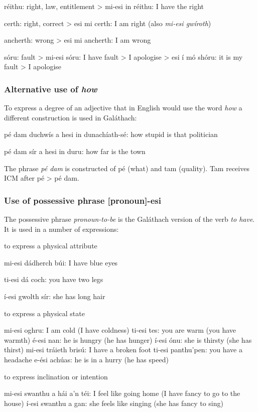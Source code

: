 r\'{e}ithu: right, law, entitlement
> mi-esi in r\'{e}ithu: I have the right

certh: right, correct
> esi mi certh: I am right (also \textit{mi-esi gw\'{i}roth})

ancherth: wrong
> esi mi ancherth: I am wrong

s\'{o}ru: fault
> mi-esi s\'{o}ru: I have fault > I apologise
> esi \'{i} m\'{o} sh\'{o}ru: it is my fault > I apologise

\subsubsection{Alternative use of \textit{how}}

To express a degree of an adjective that in English would use the word \textit{how} a different construction is used in Gal\'{a}thach:

p\'{e} dam duchw\'{i}s a hesi in dunach\'{i}ath-s\'{e}: how stupid is that politician

p\'{e} dam s\'{i}r a hesi in duru: how far is the town

The phrase \textit{p\'{e} dam} is constructed of p\'{e} (what) and tam (quality). Tam receives ICM after p\'{e} > p\'{e} dam.

\subsubsection{Use of possessive phrase [pronoun]-esi}

The possessive phrase \textit{pronoun-to-be} is the Gal\'{a}thach version of the verb \textit{to have}. It is used in a number of expressions:

    to express a physical attribute

mi-esi d\'{a}dherch b\'{u}i: I have blue eyes

ti-esi d\'{a} coch: you have two legs

\'{i}-esi gwolth s\'{i}r: she has long hair

    to express a physical state

mi-esi oghru: I am cold (I have coldness)
ti-esi tes: you are warm (you have warmth)
\'{e}-esi nan: he is hungry (he has hunger)
\'{i}-esi \'{o}nu: she is thirsty (she has thirst)
mi-esi tr\'{a}ieth bris\'{u}: I have a broken foot
ti-esi panthu'pen: you have a headache
e-\'{e}si ach\'{u}as: he is in a hurry (he has speed)

    to express inclination or intention

mi-esi swanthu a h\'{a}i a'n t\'{e}i: I feel like going home (I have fancy to go to the house)
\'{i}-esi swanthu a gan: she feels like singing (she has fancy to sing)

